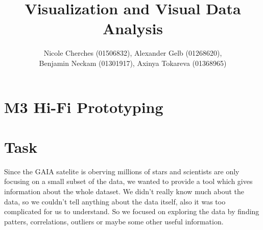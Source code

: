 \documentclass{article}
\begin{document}
\title{Visualization and Visual Data Analysis}
\author{Nicole Cherches (01506832), Alexander Gelb (01268620), \\Benjamin Neckam (01301917), Axinya Tokareva (01368965)}
\maketitle
\section*{M3  Hi-Fi Prototyping}
\section{Task}
Since the GAIA satelite is oberving millions of stars and scientists are only focusing on a small subset of the data, we wanted to provide a tool which gives information about the whole dataset. 
We didn't really know much about the data, so we couldn't tell anything about the data itself, also it was too complicated for us to understand. So we focused on exploring the data by finding patters, correlations, outliers or maybe some other useful information.\\
\newpage
\end{document}
